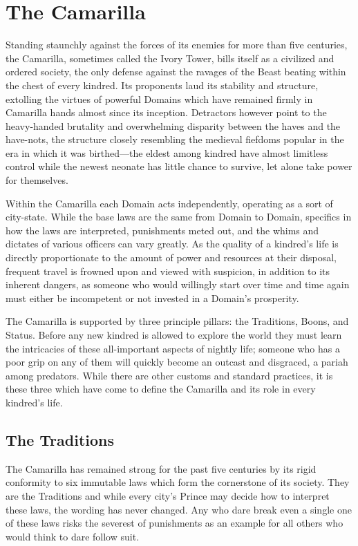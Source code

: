 \section{The Camarilla}
\label{sec:camarilla}
Standing staunchly against the forces of its enemies for more than five centuries, the 
Camarilla, sometimes called the Ivory Tower, bills itself as a civilized and ordered 
society, the only defense against the ravages of the Beast beating within the chest of 
every kindred.  Its proponents laud its stability and structure, extolling the virtues 
of powerful Domains which have remained firmly in Camarilla hands almost since its inception.
Detractors however point to the heavy-handed brutality and overwhelming disparity between the 
haves and the have-nots, the structure closely resembling the medieval fiefdoms popular in the 
era in which it was birthed---the eldest among kindred have almost limitless control while 
the newest neonate has little chance to survive, let alone take power for themselves.

Within the Camarilla each Domain acts independently, operating as a sort of city-state.  While 
the base laws are the same from Domain to Domain, specifics in how the laws are interpreted, 
punishments meted out, and the whims and dictates of various officers can vary greatly.  As 
the quality of a kindred's life is directly proportionate to the amount of power and resources 
at their disposal, frequent travel is frowned upon and viewed with suspicion, in addition to its 
inherent dangers, as someone who would willingly start over time and time again must either be 
incompetent or not invested in a Domain's prosperity.

The Camarilla is supported by three principle pillars: the Traditions, Boons, and Status.  
Before any new kindred is allowed to explore the world they must learn the intricacies of these 
all-important aspects of nightly life; someone who has a poor grip on any of them will quickly 
become an outcast and disgraced, a pariah among predators.  While there are other customs and 
standard practices, it is these three which have come to define the Camarilla and its role in 
every kindred's life.

\subsection{The Traditions}
The Camarilla has remained strong for the past five centuries by its rigid conformity to six 
immutable laws which form the cornerstone of its society.  They are the Traditions and while 
every city's Prince may decide how to interpret these laws, the wording has never changed.  
Any who dare break even a single one of these laws risks the severest of punishments as an 
example for all others who would think to dare follow suit. \\

